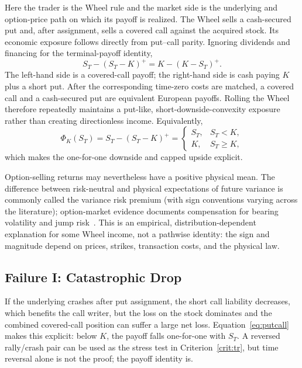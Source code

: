 \documentclass[aps,pra,reprint,superscriptaddress,amsmath,amssymb,floatfix]{revtex4-2}
\theoremstyle{plain}
\theoremstyle{definition}
\theoremstyle{remark}
\begin{document}
Here the trader is the Wheel rule and the market side is the underlying and
option-price path on which its payoff is realized. The Wheel sells a
cash-secured put and, after assignment, sells a covered call against the
acquired stock. Its economic exposure follows directly from put--call parity.
Ignoring dividends and financing for the terminal-payoff identity,
\begin{equation}
  S_T-(S_T-K)^+
  =K-(K-S_T)^+.
  \label{eq:putcall}
\end{equation}
The left-hand side is a covered-call payoff; the right-hand side is cash
paying \(K\) plus a short put. After the corresponding time-zero costs are
matched, a covered call and a cash-secured put are equivalent European
payoffs. Rolling the Wheel therefore repeatedly maintains a put-like,
short-downside-convexity exposure rather than creating directionless income.
Equivalently,
\begin{equation}
  \Phi_K(S_T)
  =S_T-(S_T-K)^+
  =
  \begin{cases}
    S_T,&S_T<K,\\
    K,&S_T\geq K,
  \end{cases}
  \label{eq:wheelpiecewise}
\end{equation}
which makes the one-for-one downside and capped upside explicit.

Option-selling returns may nevertheless have a positive physical mean. The
difference between risk-neutral and physical expectations of future variance
is commonly called the variance risk premium (with sign conventions varying
across the literature); option-market evidence documents compensation for
bearing volatility and jump risk~\cite{BakshiKapadia2003,CarrWu2009}. This is
an empirical, distribution-dependent explanation for some Wheel income, not a
pathwise identity: the sign and magnitude depend on prices, strikes,
transaction costs, and the physical law.

\subsection{Failure I: Catastrophic Drop}

If the underlying crashes after put assignment, the short call liability
decreases, which benefits the call writer, but the loss on the stock dominates
and the combined covered-call position can suffer a large net loss.
Equation~\eqref{eq:putcall} makes this explicit: below \(K\), the payoff falls
one-for-one with \(S_T\). A reversed rally/crash pair can be used as the stress
test in Criterion~\ref{crit:tr}, but time reversal alone is not the proof; the
payoff identity is.
\end{document}
